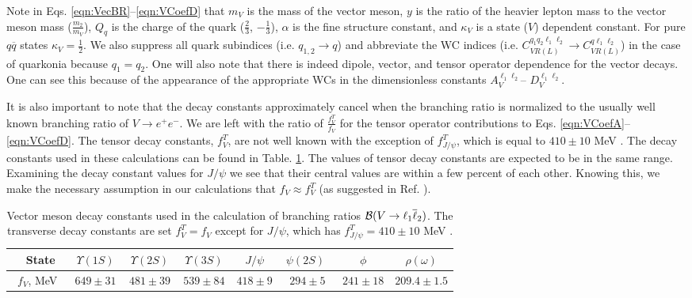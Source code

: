 \documentclass[12pt]{article}
\begin{document}
Note in Eqs. \ref{eqn:VecBR}--\ref{eqn:VCoefD} that $m_V$ is the mass of the vector meson, $y$ is the ratio of the heavier lepton mass to the vector meson mass ($\tfrac{m_2}{m_V}$), $Q_{q}$ is the charge of the quark ($\tfrac{2}{3}$, $-\tfrac{1}{3}$), $\alpha$ is the fine structure constant, and $\kappa_V$ is a state ($V$) dependent constant.  For pure $q \overline{q}$ states $\kappa_V = \tfrac{1}{2}$. We also suppress all quark subindices (i.e. $q_{1,2} \to q$) and abbreviate the WC indices (i.e. $C_{VR(L)}^{q_1 q_2 \ell_1 \ell_2} \to C_{VR(L)}^{q \ell_1 \ell_2}$) in the case of quarkonia because $q_1 = q_2$. One will also note that there is indeed dipole, vector, and tensor operator dependence for the vector decays.  One can see this because of the appearance of the appropriate WCs in the dimensionless constants  $A_V^{\ell_1\ell_2}$-- $D_V^{\ell_1\ell_2}$.  

It is also important to note that the decay constants approximately cancel when the branching ratio is normalized to the usually well known branching ratio of $V \to e^+ e^-$.  We are left with the ratio of $\tfrac{f^T_V}{f_V}$ for the tensor operator contributions to Eqs. \ref{eqn:VCoefA}--\ref{eqn:VCoefD}.  The tensor decay constants, $f^T_V$, are not well known with the exception of $f^T_{J/\psi}$, which is equal to $ 410 \pm 10$ MeV \cite{Becirevic:2013bsa}.  The decay constants used in these calculations can be found in Table. \ref{tab:Vdecay_constants}.  The values of tensor decay constants are expected to be in the same range.  Examining the decay constant values for $J/\psi$ \cite{Becirevic:2013bsa} we see that their central values are within a few percent of each other.  Knowing this, we make the necessary assumption in our calculations that $f_V \approx f^T_V$ (as suggested in Ref. \cite{Khodjamirian:2015dda}).

\begin{table}
\begin{center}
\footnotesize
\begin{tabular}{|c|c|c|c|c|c|c|c|}
\hline\hline
~State & $~\Upsilon(1S)~$ & $~\Upsilon(2S)~$ & $~\Upsilon(3S)~$ & $~J/\psi~$ & $~\psi(2S)$~  & $~\phi~$ & $~\rho \left(\omega \right)~$\\
\hline
~$f_V$, MeV~ &  $649\pm 31$   &  $481\pm 39$ &  $539\pm 84$ &  $418\pm 9$ &  $294\pm 5$ &  $241\pm 18$ & $209.4\pm 1.5$\\
\hline\hline
\end{tabular}
\normalsize
\end{center}
\caption{Vector meson decay constants used in the calculation of branching ratios ${\cal B}(V \to \ell_1 \overline \ell_2)$. 
The transverse decay constants are set $f^T_V=f_V$ except for $J/\psi$, which has 
$f^T_{J/\psi} = 410 \pm 10$ MeV
\cite{Becirevic:2013bsa,Abada:2015zea,Colquhoun:2014ica,MaiordeSousa:2012vv,Donald:2013pea,Chen:2015tpa}.
}\label{tab:Vdecay_constants} %
\end{table} 
%
\end{document}
